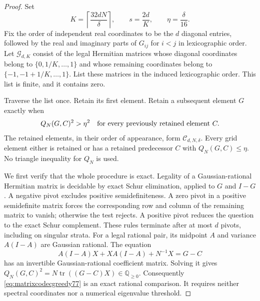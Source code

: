 \begin{proof}
Set
\begin{equation}\label{eq:matrixcodeck77}
 K=\left\lceil\frac{32dN}{\delta}\right\rceil,
 \qquad s=\frac{2d}{K},\qquad \eta=\frac{\delta}{16}.
\end{equation}
Fix the order of independent real coordinates to be the $d$ diagonal
entries, followed by the real and imaginary parts of $G_{ij}$ for
$i<j$ in lexicographic order.  Let $\mathcal G_{d,K}$ consist of the
legal Hermitian matrices whose diagonal coordinates belong to
$\{0,1/K,\ldots,1\}$ and whose remaining coordinates belong to
$\{-1,-1+1/K,\ldots,1\}$.  List these matrices in the induced
lexicographic order.  This list is finite, and it contains zero.

Traverse the list once.  Retain its first element.  Retain a subsequent
element $G$ exactly when
\begin{equation}\label{eq:matrixcodecgreedy77}
 Q_N(G,C)^2>\eta^2
 \quad\hbox{for every previously retained element }C.
\end{equation}
The retained elements, in their order of appearance, form
$\mathcal C_{d,N,\delta}$.  Every grid element either is retained or
has a retained predecessor $C$ with $Q_N(G,C)\le\eta$.
No triangle inequality for $Q_N$ is used.

We first verify that the whole procedure is exact.  Legality of a
Gaussian-rational Hermitian matrix is decidable by exact Schur
elimination, applied to $G$ and $I-G$.  A negative pivot excludes
positive semidefiniteness.  A zero pivot in a positive semidefinite
matrix forces the corresponding row and column of the remaining
matrix to vanish; otherwise the test rejects.  A positive pivot
reduces the question to the exact Schur complement.  These rules
terminate after at most $d$ pivots, including on singular strata.
For a legal rational pair, its midpoint $A$ and variance $A(I-A)$
are Gaussian rational.  The equation
\[
 A(I-A)X+XA(I-A)+N^{-1}X=G-C
\]
has an invertible Gaussian-rational coefficient matrix.  Solving it
gives
$Q_N(G,C)^2=N\operatorname{tr}((G-C)X)\in\mathbb Q_{\ge0}$.
Consequently \eqref{eq:matrixcodecgreedy77} is an exact rational
comparison.  It requires neither spectral coordinates nor a numerical
eigenvalue threshold.


\end{proof}
